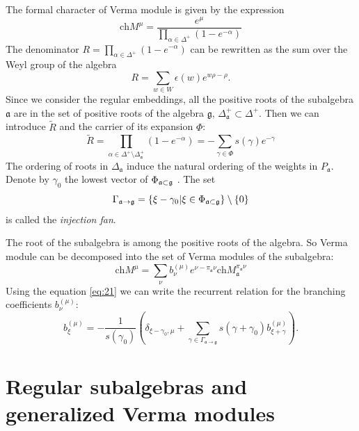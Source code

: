 \documentclass[12pt]{article}
\theoremstyle{definition}
\newcommand{\gf}{\mathfrak{g}}
\newcommand{\af}{\mathfrak{a}}
\begin{document}
The formal character of Verma module is given by the expression
\begin{equation}
  \label{eq:17}
  \mathrm{ch} M^{\mu}=\frac{e^{\mu}}{\prod_{\alpha\in \Delta^{+}} \left(1-e^{-\alpha}\right)}
\end{equation}
The denominator $R=\prod_{\alpha\in \Delta^{+}} \left(1-e^{-\alpha}\right)$ can be rewritten as the sum over the Weyl group of the algebra
\begin{equation}
  \label{eq:20}
  R=\sum_{w\in W} \epsilon(w) e^{w\rho-\rho}.
\end{equation}
Since we consider the regular embeddings, all the positive roots of the subalgebra $\af$ are in the set of positive roots of the algebra $\gf$, $\Delta^{+}_{\af}\subset \Delta^{+}$. Then we can introduce $\tilde R$ and the carrier of its expansion $\Phi$:
\begin{equation}
  \label{eq:21}
  \tilde R=\prod_{\alpha\in \Delta^{+}\setminus \Delta^{+}_{\af}} \left( 1 - e^{-\alpha}\right)=-\sum_{\gamma\in \Phi} s(\gamma) e^{-\gamma}
\end{equation}
The ordering of roots in $\Delta _{\af}$ induce the
natural ordering of the weights in $P_{\af}$. Denote by $\gamma _{0}$
the lowest vector of $\Phi _{\af\subset \frak{g}}$ . The set
\begin{equation}
\Gamma _{\af\rightarrow \frak{g}}=\left\{ \xi -\gamma _{0}|\xi \in \Phi _{%
\af\subset \frak{g}}\right\} \setminus \left\{ 0\right\}
\label{fan-defined}
\end{equation}
is called the \textit{injection fan}.


The root of the subalgebra is among the positive roots of the algebra. So  Verma module can be decomposed into the set of Verma modules of the subalgebra:
\begin{equation}
  \label{eq:18}
  \mathrm{ch}M^{\mu}=\sum_{\nu}b^{(\mu)}_{\nu} e^{\nu-\pi_{\af}\nu} \mathrm{ch}M^{\pi_{\af}\nu}_{\af}
\end{equation}
Using the equation \eqref{eq:21} we can write the recurrent relation for the branching coefficients $b^{(\mu)}_{\nu}$:
\begin{equation}
  \label{eq:19}
   b_{\xi }^{\left( \mu \right) }=-\frac{1}{s\left( \gamma _{0}\right) }\left(
        \delta_{\xi-\gamma_0,\mu}
        +\sum_{\gamma \in
          \Gamma _{\af \rightarrow \gf}}s\left( \gamma +\gamma _{0}\right) b_{\xi
          +\gamma }^{\left( \mu \right) }\right).
\end{equation}

\section{Regular subalgebras and generalized Verma modules}
\label{sec:regul-subalg-gener}
\end{document}
